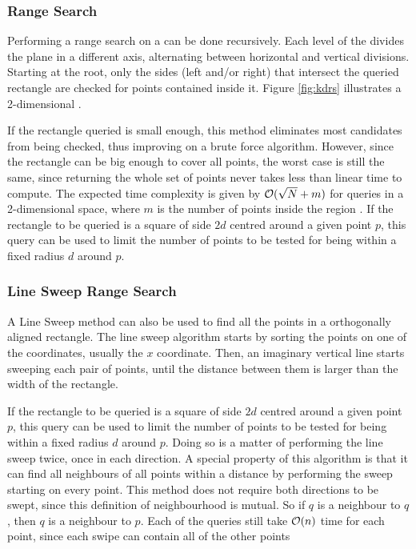 \subsubsection*{\kdTree Range Search}
\label{sect:kdrs}
Performing a range search on a \kdtree can be done recursively. Each level of the \kdtree divides the plane in a different axis, alternating between horizontal and vertical divisions. Starting at the root, only the sides (left and/or right) that intersect the queried rectangle are checked for points contained inside it. Figure \ref{fig:kdrs} illustrates a 2-dimensional \kdtree.



If the rectangle queried is small enough, this method eliminates most candidates from being checked, thus improving on a brute force algorithm. However, since the rectangle can be big enough to cover all points, the worst case is still the same, since returning the whole set of points never takes less than linear time to compute. The expected time complexity is given by $\mathcal{O}(\sqrt{N}+m)$ for queries in a 2-dimensional space, where $m$ is the number of points inside the region \cite{kdrange}. 
If the rectangle to be queried is a square of side $2d$ centred around a given point $p$, this query can be used to limit the number of points to be tested for being within a fixed radius $d$ around $p$.

\subsubsection*{Line Sweep Range Search}
\label{sect:lsrs}
A Line Sweep method can also be used to find all the points in a orthogonally aligned rectangle. The line sweep algorithm starts by sorting the points on one of the coordinates, usually the $x$ coordinate. Then, an imaginary vertical line starts sweeping each pair of points, until the distance between them is larger than the width of the rectangle.



If the rectangle to be queried is a square of side $2d$ centred around a given point $p$, this query can be used to limit the number of points to be tested for being within a fixed radius $d$ around $p$. Doing so is a matter of performing the line sweep twice, once in each direction. A special property of this algorithm is that it can find all neighbours of all points within a distance by performing the sweep starting on every point. This method does not require both directions to be swept, since this definition of neighbourhood is mutual. So if $q$ is a neighbour to $q$, then $q$ is a neighbour to $p$. Each of the queries still take $\mathcal{O}(n)$  time for each point, since each swipe can contain all of the other points

